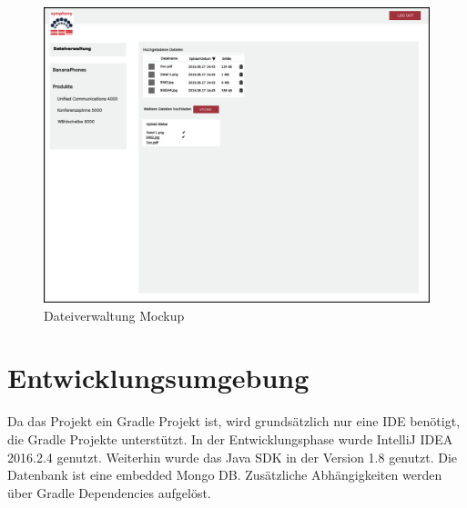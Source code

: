 \documentclass[a4paper,12pt]{article}
\begin{document}
\begin{figure}[!htb]
  \centering
     \includegraphics[width=1.0\textwidth]{projmicro_upload.png}
  \caption{Dateiverwaltung Mockup}
  \label{fig:selection}
\end{figure}

\clearpage

\section{Entwicklungsumgebung}
Da das Projekt ein Gradle Projekt ist, wird grundsätzlich nur eine IDE benötigt, die Gradle Projekte unterstützt.
In der Entwicklungsphase wurde IntelliJ IDEA 2016.2.4 genutzt. Weiterhin wurde das Java SDK in der Version 1.8 genutzt.
Die Datenbank ist eine embedded Mongo DB.
Zusätzliche Abhängigkeiten werden über Gradle Dependencies aufgelöst.

\clearpage


\end{document}
